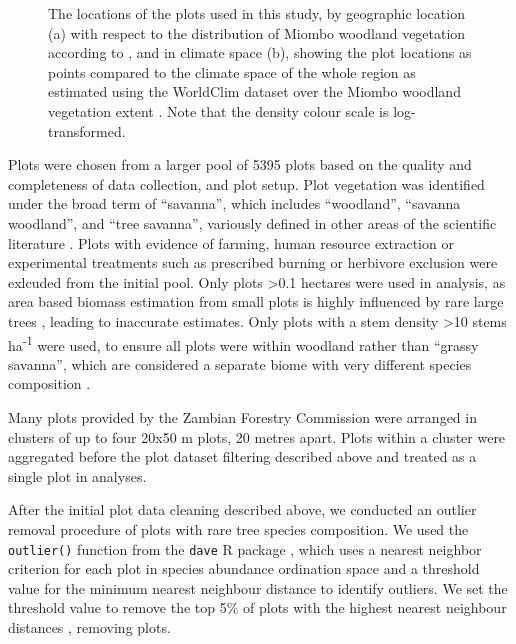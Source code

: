 \documentclass[11pt,a4paper]{article}
\begin{document}
\begin{figure}[H]
	\centering
    \qquad
{}%
\caption{The locations of the \nplots{} plots used in this study, by geographic location (a) with respect to the distribution of Miombo woodland vegetation according to \citet{White1987}, and in climate space (b), showing the plot locations as points compared to the climate space of the whole region as estimated using the WorldClim dataset over the Miombo woodland vegetation extent \citep{Fick2017}. Note that the density colour scale is log-transformed.}
\end{figure}

Plots were chosen from a larger pool of 5395 plots based on the quality and completeness of data collection, and plot setup. Plot vegetation was identified under the broad term of ``savanna'', which includes ``woodland'', ``savanna woodland'', and ``tree savanna'', variously defined in other areas of the scientific literature \citep{}. Plots with evidence of farming, human resource extraction or experimental treatments such as prescribed burning or herbivore exclusion were exlcuded from the initial pool. Only plots >0.1 hectares were used in analysis, as area based biomass estimation from small plots is highly influenced by rare large trees \citep{}, leading to inaccurate estimates. Only plots with a stem density >10 stems ha\textsuperscript{-1} were used, to ensure all plots were within woodland rather than ``grassy savanna'', which are considered a separate biome with very different species composition \citep{Parr2014}.

Many plots provided by the Zambian Forestry Commission were arranged in clusters of up to four 20x50 m plots, 20 metres apart. Plots within a cluster were aggregated before the plot dataset filtering described above and treated as a single plot in analyses.

After the initial plot data cleaning described above, we conducted an outlier removal procedure of plots with rare tree species composition. We used the \verb|outlier()| function from the \verb|dave| R package \citep{dave}, which uses a nearest neighbor criterion for each plot in species abundance ordination space and a threshold value for the minimum nearest neighbour distance to identify outliers. We set the threshold value to remove the top 5\% of plots with the highest nearest neighbour distances \citep{Otto}, removing \noutliers{} plots.
\end{document}
